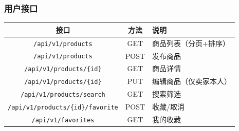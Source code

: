 \documentclass[12pt,a4paper]{ctexart}
\numberwithin{figure}{section}
\numberwithin{table}{section}
\begin{document}
\subsubsection{用户接口}

\begin{center}
\renewcommand{\arraystretch}{1.3}
\begin{tabular}{|c|c|p{6cm}|}
\hline
\rowcolor{tableheader}
\textbf{接口} & \textbf{方法} & \textbf{说明} \\
\hline
\verb|/api/v1/products| & GET & 商品列表（分页+排序） \\
\hline
\verb|/api/v1/products| & POST & 发布商品 \\
\hline
\verb|/api/v1/products/{id}| & GET & 商品详情 \\
\hline
\verb|/api/v1/products/{id}| & PUT & 编辑商品（仅卖家本人） \\
\hline
\verb|/api/v1/products/search| & GET & 搜索筛选 \\
\hline
\verb|/api/v1/products/{id}/favorite| & POST & 收藏/取消 \\
\hline
\verb|/api/v1/favorites| & GET & 我的收藏 \\
\hline
\end{tabular}
\end{center}
\end{document}
